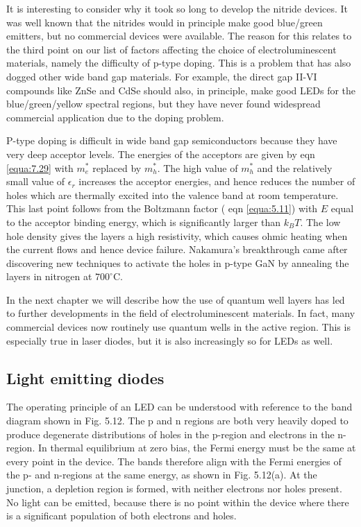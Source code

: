 \documentclass[12pt]{book}
\begin{document}
It is interesting to consider why it took so long to develop the nitride devices. It was well known that the nitrides would in principle make good blue/green emitters, but no commercial devices were available. The reason for this relates to the third point on our list of factors affecting the choice of electroluminescent materials, namely the difficulty of p-type doping. This is a problem that has also dogged other wide band gap materials. For example, the direct gap II-VI compounds like ZnSe and CdSe should also, in principle, make good LEDs for the blue/green/yellow spectral regions, but they have never found widespread commercial application due to the doping problem.

P-type doping is difficult in wide band gap semiconductors because they have very deep acceptor levels. The energies of the acceptors are given by eqn \ref{equa:7.29} with $m_e^*$ replaced by $m_h^*$. The high value of $m_h^*$ and the relatively small value of $\epsilon_r$ increases the acceptor energies, and hence reduces the number of holes which are thermally excited into the valence band at room temperature. This last point follows from the Boltzmann factor ( eqn \ref{equa:5.11}) with $E$ equal to the acceptor binding energy, which is significantly larger than $k_B T$. The low hole density gives the layers a high resistivity, which causes ohmic heating when the current flows and hence device failure. Nakamura's breakthrough came after discovering new techniques to activate the holes in p-type GaN by annealing the layers in nitrogen at $\mathrm{700^\circ C}$.

In the next chapter we will describe how the use of quantum well layers has led to further developments in the field of electroluminescent materials. In fact, many commercial devices now routinely use quantum wells in the active region. This is especially true in laser diodes, but it is also increasingly so for LEDs as well.
\subsection{Light emitting diodes}
The operating principle of an LED can be understood with reference to the band diagram shown in Fig. 5.12. The p and n regions are both very heavily doped to produce degenerate distributions of holes in the p-region and electrons in the n-region. In thermal equilibrium at zero bias, the Fermi energy must be the same at every point in the device. The bands therefore align with the Fermi energies of the p- and n-regions at the same energy, as shown in Fig. 5.12(a). At the junction, a depletion region is formed, with neither electrons nor holes present. No light can be emitted, because there is no point within the device where there is a significant population of both electrons and holes.
\end{document}
